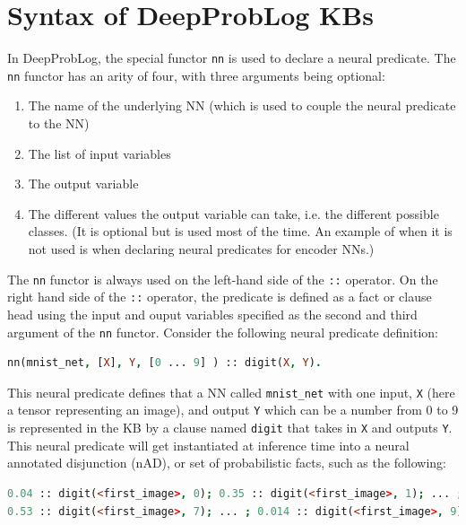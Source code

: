 \section{Syntax of DeepProbLog KBs}
In DeepProbLog, the special functor \texttt{nn} is used to declare a neural predicate. The \texttt{nn} functor has an arity of four, with three arguments being optional:
\begin{enumerate}
  \item The name of the underlying NN (which is used to couple the neural predicate to the NN)
  \item The list of input variables
  \item The output variable
  \item The different values the output variable can take, i.e. the different possible classes. (It is optional but is used most of the time. An example of when it is not used is when declaring neural predicates for encoder NNs.)
\end{enumerate}
The \texttt{nn} functor is always used on the left-hand side of the \texttt{::} operator. On the right hand side of the \texttt{::} operator, the predicate is defined as a fact or clause head using the input and ouput variables specified as the second and third argument of the \texttt{nn} functor.
Consider the following neural predicate definition:
\begin{lstlisting}[language=Prolog]
nn(mnist_net, [X], Y, [0 ... 9] ) :: digit(X, Y).
\end{lstlisting}
This neural predicate defines that a NN called \texttt{mnist\_net} with one input, \texttt{X} (here a tensor representing an image), and output \texttt{Y} which can be a number from 0 to 9 is represented in the KB by a clause named \texttt{digit} that takes in \texttt{X} and outputs \texttt{Y}. This neural predicate will get instantiated at inference time into a neural annotated disjunction (nAD), or set of probabilistic facts, such as the following:
\begin{lstlisting}[language=Prolog]
0.04 :: digit(<first_image>, 0); 0.35 :: digit(<first_image>, 1); ... ;
0.53 :: digit(<first_image>, 7); ... ; 0.014 :: digit(<first_image>, 9).
\end{lstlisting}

